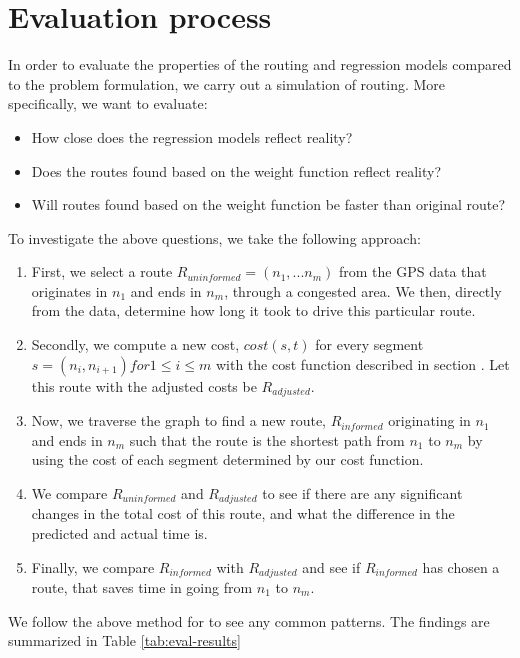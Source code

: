 \section{Evaluation process}
In order to evaluate the properties of the routing and regression models compared to the problem formulation, we carry out a simulation of routing. More specifically, we want to evaluate:
\begin{itemize}
\item How close does the regression models reflect reality?
\item Does the routes found based on the weight function reflect reality?
\item Will routes found based on the weight function be faster than original route?
\end{itemize}
To investigate the above questions, we take the following approach:
\begin{enumerate}
\item First, we select a route $R_{uninformed}=(n_1,...n_m)$ from the GPS data that originates in $n_1$ and ends in $n_m$, through a congested area. We then, directly from the data, determine how long it took to drive this particular route.
\item Secondly, we compute a new cost, $cost(s, t)$ for every segment $s=(n_i,n_{i+1}) for 1 \leq i \leq m$ with the cost function described in section . Let this route with the adjusted costs be $R_{adjusted}$.
\item Now, we traverse the graph to find a new route, $R_{informed}$ originating in $n_1$ and ends in $n_m$ such that the route is the shortest path from $n_1$ to $n_m$ by using the cost of each segment determined by our cost function.
\item We compare $R_{uninformed}$ and $R_{adjusted}$ to see if there are any significant changes in the total cost of this route, and what the difference in the predicted and actual time is.
\item Finally, we compare $R_{informed}$ with $R_{adjusted}$ and see if $R_{informed}$ has chosen a route, that saves time in going from $n_1$ to $n_m$.
\end{enumerate}
We follow the above method for  to see any common patterns. The findings are summarized in Table \ref{tab:eval-results}
